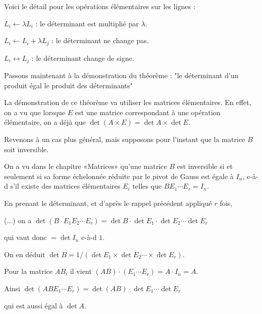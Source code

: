 % 

Voici le détail pour les opérations élémentaires sur les lignes :

\change
$L_i \leftarrow \lambda L_i$ : le déterminant est 
  multiplié par $\lambda$.
  
\change
$L_i \leftarrow L_i+\lambda L_j$ : le déterminant ne change pas.
  
\change
$L_i \leftrightarrow L_j$ : le déterminant change de signe.


\diapo

Passons maintenant à la démonstration du théorème : 
"le déterminant d'un produit égal le produit des déterminants"

\change
La démonstration de ce théorème va utiliser les matrices élémentaires.
En effet, on a vu que lorsque $E$ est une matrice correspondant à une opération élémentaire,
on a déjà que $\det (A \times E) = \det A \times \det E.$

\change

Revenons à un cas plus général, mais supposons pour l'instant que la matrice $B$ soit inversible. 


\change
On a vu dans le chapitre «Matrices» 
qu'une matrice $B$ est inversible si et seulement si sa forme échelonnée réduite 
par le pivot de Gauss est égale à $I_n$, c-à-d s'il existe des matrices élémentaires 
$E_i$ telles que $B E_1\cdots E_r = I_{n}$.

\change
En prenant le déterminant, et d'après le rappel précédent appliqué $r$ fois,

\change
(...)
\newpage
on a $\det (B  \cdot E_1 E_2 \cdots E_r)
=\det B  \cdot \det E_1  \cdot \det E_2 \cdots \det E_r $

\change
qui vaut donc $= \det I_n$ c-à-d $1$.

\change
On en déduit $\det B=1 / (\det E_1 \times \det E_2 \cdots \times \det E_r)$.

\change
Pour la matrice $AB$, il vient $(AB) \cdot (E_1\cdots E_r) = A \cdot I_n =A$.

\change
Ainsi $\det(A B E_1 \cdots E_r) = \det(A B) \cdot \det E_1  \cdots \det E_r$

\change
qui est aussi égal à $ \det A $.

